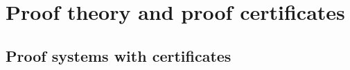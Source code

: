 \newpage
\section{Proof theory and proof certificates}
\label{sec:three}
  \newcommand{\XXi}{{\color{blue}{\Xi}}}


\subsection{Proof systems with certificates}
\label{ssec:focused}




%



